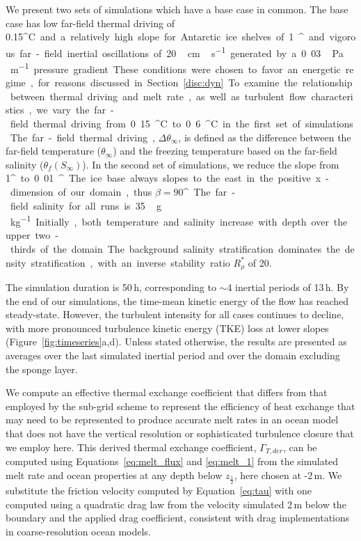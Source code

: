\documentclass[tc, manuscript]{copernicus}
\begin{document}
We present two sets of simulations which have a base case in common. The base case has low far-field thermal driving of 0.15\unit{^{\circ}C} and a relatively high slope for Antarctic ice shelves of 1\unit{^{\circ}} and vigorous far-field inertial oscillations of 20\,\unit{cm\,s^{-1}} generated by a 0.03\,\unit{Pa\,m^{-1}} pressure gradient. These conditions were chosen to favor an energetic regime, for reasons discussed in Section~\ref{disc:dyn}. To examine the relationship between thermal driving and melt rate, as well as turbulent flow characteristics, we vary the far-field thermal driving from 0.15\unit{^{\circ}C} to 0.6\unit{^{\circ}C} in the first set of simulations. The far-field thermal driving, $\Delta \theta_\infty$, is defined as the difference between the far-field temperature ($\theta_{\infty}$) and the freezing temperature based on the far-field salinity ($\theta_f(S_{\infty})$). In the second set of simulations, we reduce the slope from 1\unit{^{\circ}} to 0.01\unit{^{\circ}}. The ice base always slopes to the east in the positive x-dimension of our domain, thus $\beta = 90$\unit{^{\circ}}. The far-field salinity for all runs is 35\,\unit{g\,kg^{-1}}. Initially, both temperature and salinity increase with depth over the upper two-thirds of the domain. The background salinity stratification dominates the density stratification, with an inverse stability ratio $R_\rho^*$ of 20. 

The simulation duration is 50\,\unit{h}, corresponding to $\sim$4 inertial periods of 13\,\unit{h}. By the end of our simulations, the time-mean kinetic energy of the flow has reached steady-state. However, the turbulent intensity for all cases continues to decline, with more pronounced turbulence kinetic energy (TKE) loss at lower slopes (Figure~\ref{fig:timeseries}a,d). Unless stated otherwise, the results are presented as averages over the last simulated inertial period and over the domain excluding the sponge layer.

We compute an effective thermal exchange coefficient that differs from that employed by the sub-grid scheme to represent the efficiency of heat exchange that may need to be represented to produce accurate melt rates in an ocean model that does not have the vertical resolution or sophisticated turbulence closure that we employ here. This derived thermal exchange coefficient, $\Gamma_{T,der}$, can be computed using Equations~\ref{eq:melt_flux} and \ref{eq:melt_1} from the simulated melt rate and ocean properties at any depth below $z_{\frac{1}{2}}$, here chosen at -2\,\unit{m}. We substitute the friction velocity computed by Equation~\ref{eq:tau} with one computed using a quadratic drag law from the velocity simulated 2\,\unit{m} below the boundary and the applied drag coefficient, consistent with drag implementations in coarse-resolution ocean models. 
\end{document}
